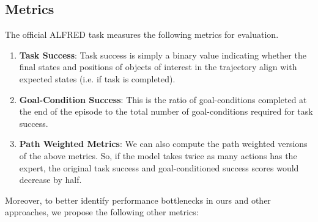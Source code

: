 \documentclass[11pt,a4paper]{article}
\begin{document}
\subsection{Metrics}
The official ALFRED task measures the following metrics for evaluation.
\begin{enumerate}
    \item \textbf{Task Success}: Task success is simply a binary value indicating whether the final states and positions of objects of interest in the trajectory align with expected states (i.e. if task is completed).
    \item \textbf{Goal-Condition Success}: This is the ratio of goal-conditions completed at the end of the episode to the total number of goal-conditions required for task success.
    \item \textbf{Path Weighted Metrics}: We can also compute the path weighted versions of the above metrics. So, if the model takes twice as many actions has the expert, the original task success and goal-conditioned success scores would decrease by half.
\end{enumerate}


Moreover, to better identify performance bottlenecks in ours and other approaches, we propose the following other metrics:
\end{document}
